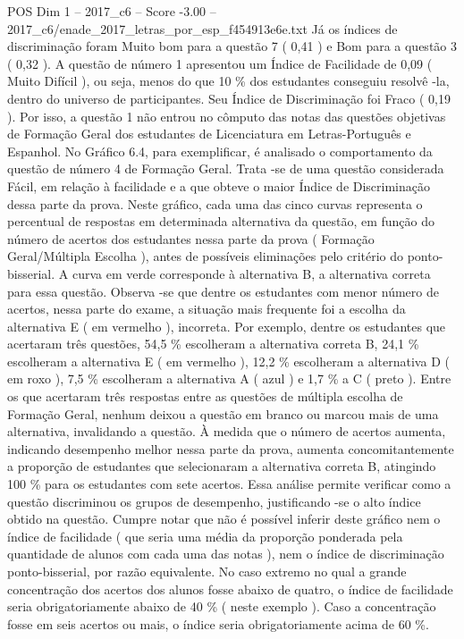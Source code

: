 \begin{textsample}{POS Dim 1 – 2017\_c6 – Score -3.00 – 2017\_c6/enade\_2017\_letras\_por\_esp\_f454913e6e.txt}
Já os índices de discriminação foram Muito bom para a questão 7 ( 0,41 ) e Bom para a questão 3 ( 0,32 ).
A questão de número 1 apresentou um Índice de Facilidade de 0,09 ( Muito Difícil ), ou seja, menos do que 10 \% dos estudantes conseguiu resolvê -la, dentro do universo de participantes.
Seu Índice de Discriminação foi Fraco ( 0,19 ).
Por isso, a questão 1 não entrou no cômputo das notas das questões objetivas de Formação Geral dos estudantes de Licenciatura em Letras-Português e Espanhol.
No Gráfico 6.4, para exemplificar, é analisado o comportamento da questão de número 4 de Formação Geral.
Trata -se de uma questão considerada Fácil, em relação à facilidade e a que obteve o maior Índice de Discriminação dessa parte da prova.
Neste gráfico, cada uma das cinco curvas representa o percentual de respostas em determinada alternativa da questão, em função do número de acertos dos estudantes nessa parte da prova ( Formação Geral/Múltipla Escolha ), antes de possíveis eliminações pelo critério do ponto-bisserial.
A curva em verde corresponde à alternativa B, a alternativa correta para essa questão.
Observa -se que dentre os estudantes com menor número de acertos, nessa parte do exame, a situação mais frequente foi a escolha da alternativa E ( em vermelho ), incorreta.
Por exemplo, dentre os estudantes que acertaram três questões, 54,5 \% escolheram a alternativa correta B, 24,1 \% escolheram a alternativa E ( em vermelho ), 12,2 \% escolheram a alternativa D ( em roxo ), 7,5 \% escolheram a alternativa A ( azul ) e 1,7 \% a C ( preto ).
Entre os que acertaram três respostas entre as questões de múltipla escolha de Formação Geral, nenhum deixou a questão em branco ou marcou mais de uma alternativa, invalidando a questão.
À medida que o número de acertos aumenta, indicando desempenho melhor nessa parte da prova, aumenta concomitantemente a proporção de estudantes que selecionaram a alternativa correta B, atingindo 100 \% para os estudantes com sete acertos.
Essa análise permite verificar como a questão discriminou os grupos de desempenho, justificando -se o alto índice obtido na questão.
Cumpre notar que não é possível inferir deste gráfico nem o índice de facilidade ( que seria uma média da proporção ponderada pela quantidade de alunos com cada uma das notas ), nem o índice de discriminação ponto-bisserial, por razão equivalente.
No caso extremo no qual a grande concentração dos acertos dos alunos fosse abaixo de quatro, o índice de facilidade seria obrigatoriamente abaixo de 40 \% ( neste exemplo ).
Caso a concentração fosse em seis acertos ou mais, o índice seria obrigatoriamente acima de 60 \%.

\end{textsample}
